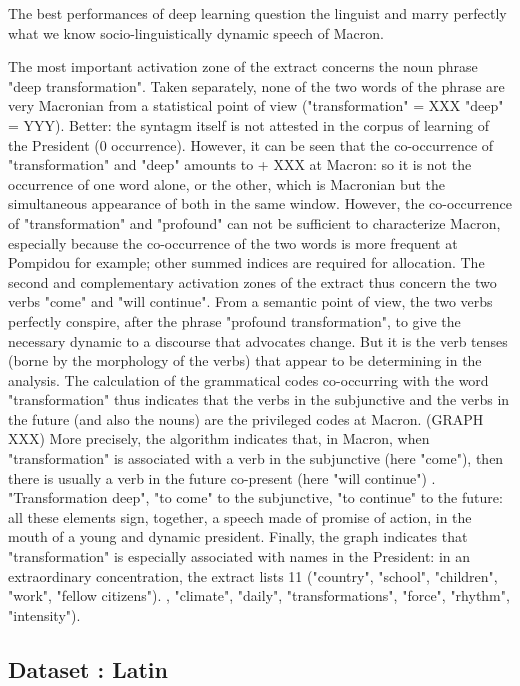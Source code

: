 The best performances of deep learning question the linguist and marry perfectly what we know socio-linguistically dynamic speech of Macron.

The most important activation zone of the extract concerns the noun phrase "deep transformation".
Taken separately, none of the two words of the phrase are very Macronian from a statistical point of view ("transformation" = XXX "deep" = YYY). Better: the syntagm itself is not attested in the corpus of learning of the President (0 occurrence).
However, it can be seen that the co-occurrence of "transformation" and "deep" amounts to + XXX at Macron: so it is not the occurrence of one word alone, or the other, which is Macronian but the simultaneous appearance of both in the same window.
However, the co-occurrence of "transformation" and "profound" can not be sufficient to characterize Macron, especially because the co-occurrence of the two words is more frequent at Pompidou for example; other summed indices are required for allocation.
The second and complementary activation zones of the extract thus concern the two verbs "come" and "will continue".
From a semantic point of view, the two verbs perfectly conspire, after the phrase "profound transformation", to give the necessary dynamic to a discourse that advocates change. But it is the verb tenses (borne by the morphology of the verbs) that appear to be determining in the analysis.
The calculation of the grammatical codes co-occurring with the word "transformation" thus indicates that the verbs in the subjunctive and the verbs in the future (and also the nouns) are the privileged codes at Macron. (GRAPH XXX)
More precisely, the algorithm indicates that, in Macron, when "transformation" is associated with a verb in the subjunctive (here "come"), then there is usually a verb in the future co-present (here "will continue") .
"Transformation deep", "to come" to the subjunctive, "to continue" to the future: all these elements sign, together, a speech made of promise of action, in the mouth of a young and dynamic president.
Finally, the graph indicates that "transformation" is especially associated with names in the President: in an extraordinary concentration, the extract lists 11 ("country", "school", "children", "work", "fellow citizens"). , "climate", "daily", "transformations", "force", "rhythm", "intensity").

\subsection{Dataset : Latin}

